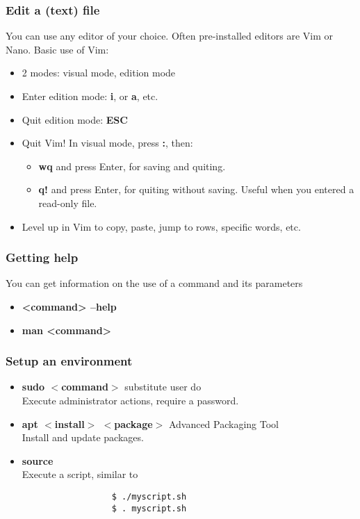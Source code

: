\begin{frame}
   \frametitle{Edit a (text) file}
   You can use any editor of your choice. Often pre-installed editors are Vim or Nano. Basic use of Vim:
   \begin{itemize}
      \item 2 modes: visual mode, edition mode
      \item Enter edition mode: \textbf{i}, or \textbf{a}, etc.
      \item Quit edition mode: \textbf{ESC}
      \item Quit Vim! In visual mode, press \textbf{:}, then:
      \begin{itemize}
         \item \textbf{wq} and press Enter, for saving and quiting.
         \item \textbf{q!} and press Enter, for quiting without saving. Useful when you entered a read-only file.
      \end{itemize}
      \item Level up in Vim to copy, paste, jump to rows, specific words, etc.
   \end{itemize}
\end{frame}

\begin{frame}[fragile]
   \frametitle{Getting help}
   You can get information on the use of a command and its parameters
   \begin{itemize}
      \item {\bf <command> --help}
      \item {\bf man <command>}
   \end{itemize}
\end{frame}

\begin{frame}[fragile]
   \frametitle{Setup an environment}
      \begin{itemize}
         \item {\bf sudo $<$command$>$} substitute user do \\
               Execute administrator actions, require a password.
         \item {\bf apt $<$install$>$ $<$package$>$} Advanced Packaging Tool \\
               Install and update packages.
         \item {\bf source} \\
               Execute a script, similar to
               \begin{verbatim}
                  $ ./myscript.sh
                  $ . myscript.sh
               \end{verbatim}
      \end{itemize}
   \end{frame}

